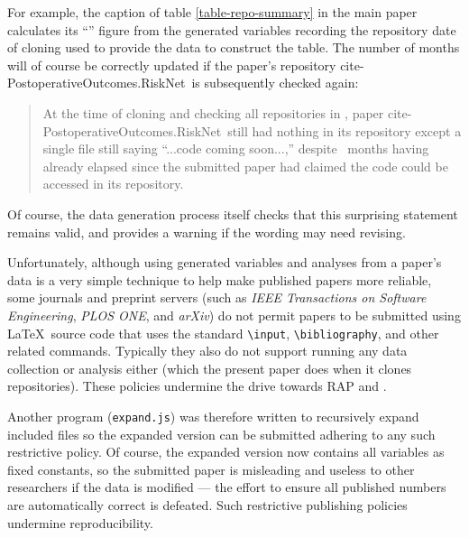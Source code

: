 \documentclass[10pt,a4paper]{article}
\begin{document}
\begin{change}
For example, the caption of table \ref{table-repo-summary} in the main paper calculates its ``'' figure from the generated variables recording the repository date of cloning used to provide the data to construct the table. The number of months will of course be correctly updated if the paper's repository \csname cite-PostoperativeOutcomes.RiskNet\endcsname\ is subsequently checked again:

\begin{quote}
At the time of cloning and checking all repositories in \clonewhen, paper \csname cite-PostoperativeOutcomes.RiskNet\endcsname\ still had nothing in its repository except a single file still saying ``...code coming soon...,'' despite \the\pubdelayinmonths\ months having already elapsed since the submitted paper had claimed the code could be accessed in its repository.\end{quote}

Of course, the data generation process itself checks that this surprising statement remains valid, and provides a warning if the wording may need revising.

Unfortunately, although using generated variables and analyses from a paper's data is a very simple technique to help make published papers more reliable, some journals and preprint servers (such as \emph{IEEE Transactions on Software Engineering}, \emph{PLOS ONE}, and \emph{arXiv\/}) do not permit papers to be submitted using \LaTeX\ source code that uses the standard \texttt{\textbackslash input}, \texttt{\textbackslash bibliography}, and other related commands. Typically they also do not support running any data collection or analysis either (which the present paper does when it clones repositories). These policies undermine the drive towards RAP and \RAPstarp.

Another program (\texttt{expand.js}) was therefore written to recursively expand included files so the expanded version can be submitted adhering to any such restrictive policy. Of course, the expanded version now contains all variables as fixed constants, so the submitted paper is misleading and useless to other researchers if the data is modified --- the effort to ensure all published numbers are automatically correct is defeated. Such restrictive publishing policies undermine reproducibility.
\end{change}


\def\flagStyle#1{\textcolor{blue}{\sf #1}}
\end{document}

